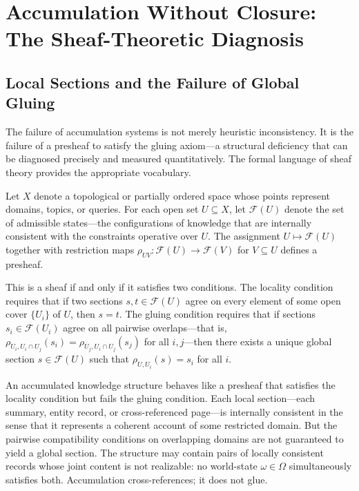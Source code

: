\documentclass[12pt, oneside]{article}
\begin{document}
\section{Accumulation Without Closure: The Sheaf-Theoretic Diagnosis}

\subsection{Local Sections and the Failure of Global Gluing}

The failure of accumulation systems is not merely heuristic inconsistency. It is the failure of a presheaf to satisfy the gluing axiom---a structural deficiency that can be diagnosed precisely and measured quantitatively. The formal language of sheaf theory provides the appropriate vocabulary.

Let $X$ denote a topological or partially ordered space whose points represent domains, topics, or queries. For each open set $U \subseteq X$, let $\mathcal{F}(U)$ denote the set of admissible states---the configurations of knowledge that are internally consistent with the constraints operative over $U$. The assignment $U \mapsto \mathcal{F}(U)$ together with restriction maps $\rho_{UV} : \mathcal{F}(U) \to \mathcal{F}(V)$ for $V \subseteq U$ defines a presheaf.

This is a sheaf if and only if it satisfies two conditions. The locality condition requires that if two sections $s, t \in \mathcal{F}(U)$ agree on every element of some open cover $\{U_i\}$ of $U$, then $s = t$. The gluing condition requires that if sections $s_i \in \mathcal{F}(U_i)$ agree on all pairwise overlaps---that is, $\rho_{U_i, U_i \cap U_j}(s_i) = \rho_{U_j, U_i \cap U_j}(s_j)$ for all $i, j$---then there exists a unique global section $s \in \mathcal{F}(U)$ such that $\rho_{U, U_i}(s) = s_i$ for all $i$.

An accumulated knowledge structure behaves like a presheaf that satisfies the locality condition but fails the gluing condition. Each local section---each summary, entity record, or cross-referenced page---is internally consistent in the sense that it represents a coherent account of some restricted domain. But the pairwise compatibility conditions on overlapping domains are not guaranteed to yield a global section. The structure may contain pairs of locally consistent records whose joint content is not realizable: no world-state $\omega \in \Omega$ simultaneously satisfies both. Accumulation cross-references; it does not glue.
\end{document}
